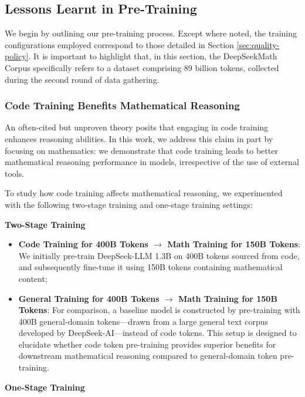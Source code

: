 \begin{itemize}[topsep=0pt]
\begin{itemize}[topsep=0pt]
\subsection{Lessons Learnt in Pre-Training}

We begin by outlining our pre-training process. Except where noted, the training configurations employed correspond to those detailed in Section \ref{sec:quality-policy}. It is important to highlight that, in this section, the DeepSeekMath Corpus specifically refers to a dataset comprising 89 billion tokens, collected during the second round of data gathering.

\subsubsection{Code Training Benefits Mathematical Reasoning}

An often-cited but unproven theory posits that engaging in code training enhances reasoning abilities. In this work, we address this claim in part by focusing on mathematics: we demonstrate that code training leads to better mathematical reasoning performance in models, irrespective of the use of external tools.

To study how code training affects mathematical reasoning, we experimented with the following two-stage training and one-stage training settings:

\textbf{Two-Stage Training}

\begin{itemize}[topsep=0pt]
    \item \textbf{Code Training for 400B Tokens $\rightarrow$ Math Training for 150B Tokens}: We initially pre-train DeepSeek-LLM 1.3B on 400B tokens sourced from code, and subsequently fine-tune it using 150B tokens containing mathematical content;
    \item \textbf{General Training for 400B Tokens $\rightarrow$ Math Training for 150B Tokens}: For comparison, a baseline model is constructed by pre-training with 400B general-domain tokens—drawn from a large general text corpus developed by DeepSeek-AI—instead of code tokens. This setup is designed to elucidate whether code token pre-training provides superior benefits for downstream mathematical reasoning compared to general-domain token pre-training.
\end{itemize}

\textbf{One-Stage Training}


\end{itemize}
\end{itemize}
